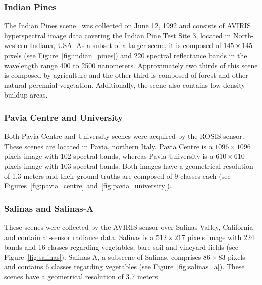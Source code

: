 \documentclass[remotesensing,article,submit,moreauthors,pdftex]{Definitions/mdpi}
\begin{document}
\begin{paracol}{2}
\linenumbers
\switchcolumn

\subsubsection*{Indian Pines} 

The Indian Pines scene~\cite{Baumgardner2015} was collected on June 12, 1992 and
consists of AVIRIS hyperspectral image data covering the Indian Pine Test Site
3, located in North-western Indiana, USA. As a subset of a larger scene, it is
composed of $145 \times 145$ pixels (see Figure~\ref{fig:indian_pines}) and 220
spectral reflectance bands in the wavelength range 400 to 2500 nanometers.
Approximately two thirds of this scene is composed by agriculture and the other
third is composed of forest and other natural perennial vegetation.
Additionally, the scene also contains low density buildup areas.

\subsubsection*{Pavia Centre and University}

Both Pavia Centre and University scenes were acquired by the ROSIS sensor. These
scenes are located in Pavia, northern Italy. Pavia Centre is a $1096 \times
1096$ pixels image with 102 spectral bands, whereas Pavia University is a $610
\times 610$ pixels image with 103 spectral bands.  Both images have a
geometrical resolution of 1.3 meters and their ground truths are composed of 9
classes each (see Figures~\ref{fig:pavia_centre}
and~\ref{fig:pavia_university}).

\subsubsection*{Salinas and Salinas-A}

These scenes were collected by the AVIRIS sensor over Salinas Valley, California
and contain at-sensor radiance data. Salinas is a $512 \times 217$ pixels image
with 224 bands and 16 classes regarding vegetables, bare soil and vineyard
fields (see Figure~\ref{fig:salinas}). Salinas-A, a subscene of Salinas,
comprises $86 \times 83$ pixels and contains 6 classes regarding vegetables (see
Figure~\ref{fig:salinas_a}). These scenes have a geometrical resolution of 3.7
meters.


\end{paracol}
\end{document}
